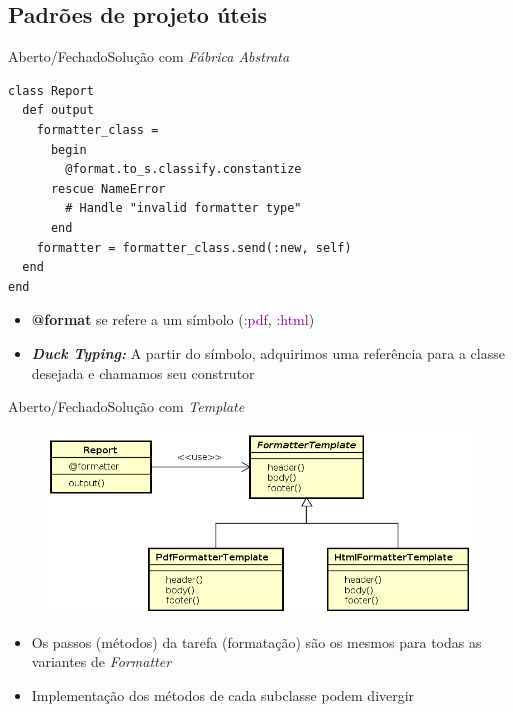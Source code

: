 \documentclass[10pt]{beamer}
\begin{document}
\subsection{Padrões de projeto úteis}
\begin{frame}[fragile]{Aberto/Fechado}{Solução com \textit{Fábrica Abstrata}}

\begin{lstlisting}
class Report
  def output
    formatter_class = 
      begin
        @format.to_s.classify.constantize
      rescue NameError
        # Handle "invalid formatter type"
      end
    formatter = formatter_class.send(:new, self)
  end
end
\end{lstlisting}

\begin{itemize}
  \item \textbf{@format} se refere a um símbolo (\textcolor{purple}{:pdf}, \textcolor{purple}{:html})
  \pause
  \item \textbf{\textit{Duck Typing:}} A partir do símbolo, adquirimos uma referência para a classe desejada e chamamos seu construtor
\end{itemize}

\end{frame}


\begin{frame}[fragile]{Aberto/Fechado}{Solução com \textit{Template}}

\begin{figure}
  \includegraphics[width=1.0\textwidth]{images/templatePattern.png}
\end{figure}

\begin{itemize}
  \item Os passos (métodos) da tarefa (formatação) são os mesmos para todas as variantes de \textit{Formatter}
  \item Implementação dos métodos de cada subclasse podem divergir
\end{itemize}

\end{frame}
\end{document}
